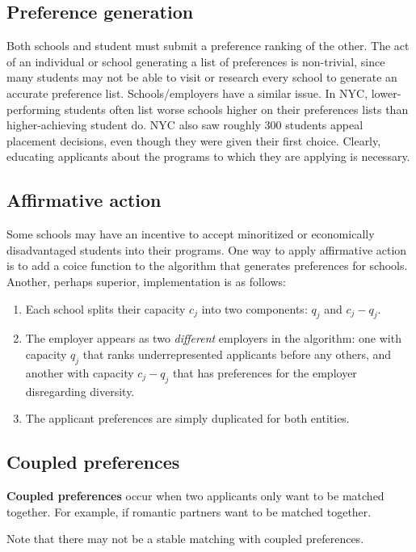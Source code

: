 \documentclass[titlepage, 12pt, leqno]{article}
\begin{document}
\subsection{Preference generation}
Both schools and student must submit a preference ranking of the other.
The act of an individual or school generating a list of preferences is
non-trivial, since many students may not be able to visit or research every
school to generate an accurate preference list. Schools/employers have a
similar issue. In NYC, lower-performing students often list worse schools
higher on their preferences lists than higher-achieving student do. NYC also saw
roughly 300 students appeal placement decisions, even though they were given their
first choice. Clearly, educating applicants about the programs to which they are
applying is necessary.

\subsection{Affirmative action}
Some schools may have an incentive to accept minoritized or economically 
disadvantaged students into their programs. One way to apply affirmative action is
to add a coice function to the algorithm that generates preferences for schools.
Another, perhaps superior, implementation is as follows:
\begin{enumerate}
    \item Each school splits their capacity $c_j$ into two components: $q_j$ and
        $c_j-q_j$.
    \item The employer appears as two \textit{different} employers in the
        algorithm: one with capacity $q_j$ that ranks underrepresented applicants
        before any others, and another with capacity $c_j-q_j$ that has 
        preferences for the employer disregarding diversity.
    \item The applicant preferences are simply duplicated for both entities.
\end{enumerate}

\subsection{Coupled preferences}
\begin{definition}
    \textbf{Coupled preferences} occur when two applicants only want to be matched
    together. For example, if romantic partners want to be matched together.
    \begin{note}
        Note that there may not be a stable matching with coupled preferences.
    \end{note}
\end{definition}
\end{document}
